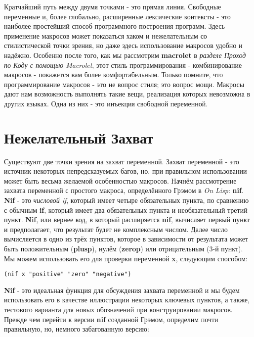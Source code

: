 Кратчайший путь между двумя точками - это прямая линия. Свободные переменные и, более глобально, расширенные лексические контексты - это наиболее простейший способ программного построения программ. Здесь применение макросов может показаться хаком и нежелательным со стилистической точки зрения, но даже здесь использование макросов удобно и надёжно. Особенно после того, как мы рассмотрим \textbf{macrolet} в \emph{разделе Проход по Коду с помощью Macrolet}, этот стиль программирования - комбинирование макросов - покажется вам более комфортабельным. Только помните, что программирование макросов - это не вопрос стиля; это вопрос мощи. Макросы дают нам возможность выполнять такие вещи, реализация которых невозможна в других языках. Одна из них - это инъекция свободной переменной.

\section{Нежелательный Захват}\label{section_unwanted_capture}

Существуют две точки зрения на захват переменной. Захват переменной - это источник некоторых непредсказуемых багов, но, при правильном использовании может быть весьма желаемой особенностью макросов. Начнём рассмотрение захвата переменной с простого макроса, определённого Грэмом в \emph{On Lisp}: \textbf{nif}. \textbf{Nif} - это \emph{числовой if}, который имеет четыре обязательных пункта, по сравнению с обычным \textbf{if}, который имеет два обязательных пункта и необязательный третий пункт. \textbf{Nif}, или вернее код, в который расширяется \textbf{nif}, вычисляет первый пункт и предполагает, что результат будет не комплексным числом. Далее число вычисляется в одно из трёх пунктов, которое в зависимости от результата может быть положительным (\textbf{plusp}), нулём (\textbf{zerop}) или отрицательным (3-й пункт). Мы можем использовать его для проверки переменной \textbf{x}, следующим способом:

\begin{verbatim}
(nif x "positive" "zero" "negative")
\end{verbatim}

 \textbf{Nif} - это идеальная функция для обсуждения захвата переменной и мы будем использовать его в качестве иллюстрации некоторых ключевых пунктов, а также, тестового варианта для новых обозначений при конструировании макросов. Прежде чем перейти к версии \textbf{nif} созданной Грэмом, определим почти правильную, но, немного забагованную версию:

